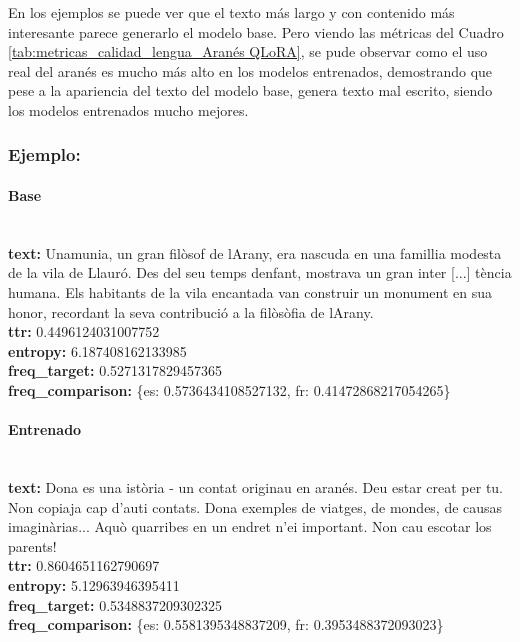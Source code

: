 En los ejemplos se puede ver que el texto más largo y con contenido más interesante parece generarlo el modelo base. Pero viendo las métricas del Cuadro \ref{tab:metricas_calidad_lengua_Aranés QLoRA}, se pude observar como el uso real del aranés es mucho más alto en los modelos entrenados, demostrando que pese a la apariencia del texto del modelo base, genera texto mal escrito, siendo los modelos entrenados mucho mejores.

\subsubsection{Ejemplo:}

\paragraph{Base}~\\
\textbf{text:} Unamunia, un gran filòsof de l\textquotesingle{}Arany, era nascuda en una famillia modesta de la vila de Llauró. Des del seu temps d\textquotesingle{}enfant, mostrava un gran inter [...] tència humana. Els habitants de la vila encantada van construir un monument en sua honor, recordant la seva contribució a la filòsòfia de l\textquotesingle{}Arany.\\
\textbf{ttr:} 0.4496124031007752\\
\textbf{entropy:} 6.187408162133985\\
\textbf{freq\_target:} 0.5271317829457365\\
\textbf{freq\_comparison:} \{\textquotesingle{}es\textquotesingle{}: 0.5736434108527132, \textquotesingle{}fr\textquotesingle{}: 0.41472868217054265\}

\paragraph{Entrenado}~\\
\textbf{text:} Dona es una istòria - un contat originau en aranés. Deu estar creat per tu. Non copiaja cap\textquotesingle{} d’auti contats. Dona exemples de viatges, de mondes, de causas imaginàrias... Aquò qu\textquotesingle{}arribes en un endret n’ei important. Non cau escotar los parents!\\
\textbf{ttr:} 0.8604651162790697\\
\textbf{entropy:} 5.12963946395411\\
\textbf{freq\_target:} 0.5348837209302325\\
\textbf{freq\_comparison:} \{\textquotesingle{}es\textquotesingle{}: 0.5581395348837209, \textquotesingle{}fr\textquotesingle{}: 0.3953488372093023\}

